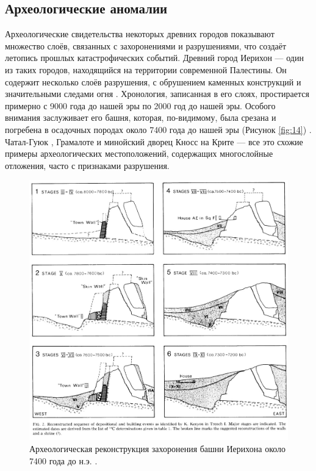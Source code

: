 \documentclass[10pt,twocolumn,letterpaper]{article}
\begin{document}
\subsection{Археологические аномалии}

Археологические свидетельства некоторых древних городов показывают множество слоёв, связанных с захоронениями и разрушениями, что создаёт летопись прошлых катастрофических событий. Древний город Иерихон — один из таких городов, находящийся на территории современной Палестины. Он содержит несколько слоёв разрушения, с обрушением каменных конструкций и значительными следами огня \cite{96,97}. Хронология, записанная в его слоях, простирается примерно с 9000 года до нашей эры по 2000 год до нашей эры. Особого внимания заслуживает его башня, которая, по-видимому, была срезана и погребена в осадочных породах около 7400 года до нашей эры (Рисунок \ref{fig:14}) \cite{95}. Чатал-Гуюк \cite{99}, Грамалоте \cite{98} и минойский дворец Кносс на Крите \cite{100,101} — все это схожие примеры археологических местоположений, содержащих многослойные отложения, часто с признаками разрушения.

\begin{figure}[t]
\begin{center}
   \includegraphics[width=1\linewidth]{jericho.jpg}
\end{center}
   \caption{Археологическая реконструкция захоронения башни Иерихона около 7400 года до н.э. \cite{95}.}
\label{fig:14}
\label{fig:onecol}
\end{figure}
\end{document}
